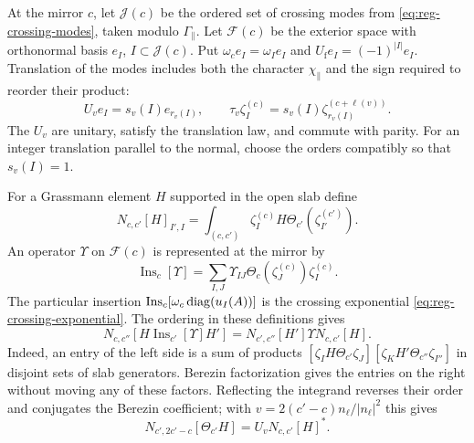 At the mirror $c$, let $\mathcal J(c)$ be the ordered set of crossing
modes from \eqref{eq:reg-crossing-modes}, taken modulo
$\Gamma_\parallel$. Let $\mathcal F(c)$ be the exterior space with
orthonormal basis $e_I$, $I\subset\mathcal J(c)$. Put
$\omega_c e_I=\omega_Ie_I$ and $U_{\mathrm f}e_I=(-1)^{|I|}e_I$.
Translation of the modes includes both the character
$\chi_\parallel$ and the sign required to reorder their product:
\[
 U_ve_I=s_v(I)e_{r_v(I)},\qquad
 \tau_v\zeta_I^{(c)}=s_v(I)\zeta_{r_v(I)}^{(c+\ell(v))}.
\]
The $U_v$ are unitary, satisfy the translation law, and commute with
parity. For an integer translation parallel to the normal, choose the
orders compatibly so that $s_v(I)=1$.

For a Grassmann element $H$ supported in the open slab define
\begin{equation}\label{eq:slab-fermion-matrix}
 N_{c,c'}[H]_{I',I}
    =\int_{(c,c')}\zeta_I^{(c)}H
                        \Theta_{c'}(\zeta_{I'}^{(c')}).
\end{equation}
An operator $\Upsilon$ on $\mathcal F(c)$ is represented at the
mirror by
\[
 \operatorname{Ins}_c[\Upsilon]
       =\sum_{I,J}\Upsilon_{IJ}\Theta_c(\zeta_J^{(c)})\zeta_I^{(c)}.
\]
The particular insertion
$\operatorname{Ins}_c[\omega_c\operatorname{diag}(u_I(A))]$ is the crossing
exponential \eqref{eq:reg-crossing-exponential}. The ordering in these
definitions gives
\begin{equation}\label{eq:slab-matrix-composition}
 N_{c,c''}[H\operatorname{Ins}_{c'}[\Upsilon]H']
             =N_{c',c''}[H']\Upsilon N_{c,c'}[H].
\end{equation}
Indeed, an entry of the left side is a sum of products
$[\zeta_IH\Theta_{c'}\zeta_J]
 [\zeta_KH'\Theta_{c''}\zeta_{I''}]$ in disjoint sets of slab
generators. Berezin factorization gives the entries on the right
without moving any of these factors. Reflecting the integrand reverses
their order and conjugates the Berezin coefficient; with
$v=2(c'-c)n_\ell/|n_\ell|^2$ this gives
\begin{equation}\label{eq:slab-matrix-adjoint}
 N_{c',2c'-c}[\Theta_{c'}H]=U_vN_{c,c'}[H]^*.
\end{equation}

